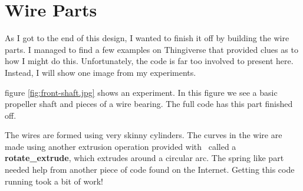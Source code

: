 \section{Wire Parts}

As I got to the end of this design, I wanted to finish it off by building the
wire parts. I managed to find a few examples on {Thingiverse} that provided
clues as to how I might do this. Unfortunately, the code is far too involved to
present here. Instead, I will show one image from my experiments.


figure \ref{fig:front-shaft.jpg} shows an experiment. In this figure we see a basic
propeller shaft and pieces of a wire bearing. The full code has this part
finished off.

The wires are formed using very skinny cylinders. The curves in the wire are
made using another extrusion operation provided with \osc\ called a {\bf
rotate\_extrude}, which extrudes around a circular arc. The spring like part
needed help from another piece of code found on the Internet. Getting this code
running took a bit of work!
